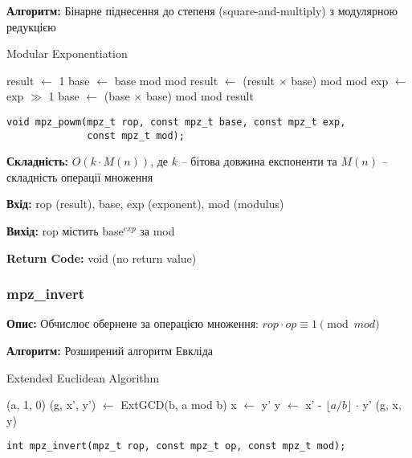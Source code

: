\textbf{Алгоритм:} Бінарне піднесення до степеня (square-and-multiply) з модулярною редукцією

\begin{algorithm}
    \caption{Modular Exponentiation}
    \begin{algorithmic}[1]
        \State result $\gets$ 1
        \State base $\gets$ base mod mod
        \State result $\gets$ (result $\times$ base) mod mod
        \EndIf
        \State exp $\gets$ exp $\gg$ 1
        \State base $\gets$ (base $\times$ base) mod mod
        \EndWhile
        \State \Return result
        \EndFunction
    \end{algorithmic}
\end{algorithm}

\begin{verbatim}
void mpz_powm(mpz_t rop, const mpz_t base, const mpz_t exp, 
              const mpz_t mod);
\end{verbatim}

\textbf{Складність:} $O(k \cdot M(n))$, де $k$ -- бітова довжина експоненти та $M(n)$ -- складність операції множення

\textbf{Вхід:} rop (result), base, exp (exponent), mod (modulus)

\textbf{Вихід:} rop містить base$^{exp}$ за mod

\textbf{Return Code:} void (no return value)

\subsubsection{mpz\_invert}
\textbf{Опис:} Обчислює обернене за операцією множення: $rop \cdot op \equiv 1 \pmod{mod}$

\textbf{Алгоритм:} Розширений алгоритм Евкліда

\begin{algorithm}
    \caption{Extended Euclidean Algorithm}
    \begin{algorithmic}[1]
        \State \Return (a, 1, 0)
        \EndIf
        \State (g, x', y') $\gets$ ExtGCD(b, a mod b)
        \State x $\gets$ y'
        \State y $\gets$ x' - $\lfloor a/b \rfloor$ $\cdot$ y'
        \State \Return (g, x, y)
        \EndFunction
    \end{algorithmic}
\end{algorithm}

\begin{verbatim}
int mpz_invert(mpz_t rop, const mpz_t op, const mpz_t mod);
\end{verbatim}

